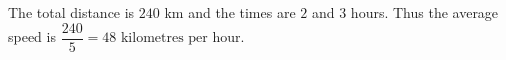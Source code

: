 The total distance is $240$ km and the times are $2$ and $3$ hours. Thus the average speed is $\dfrac{240}{5}=\boxed{48\text{ kilometres per hour}}$.
